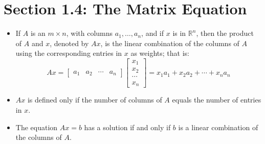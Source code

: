 \documentclass{article}
\newtheorem{theorem}{Theorem}
\begin{document}
\section*{Section 1.4: The Matrix Equation}

\begin{itemize}

  \item If $A$ is an $m \times n$, with columns $a_1, \ldots, a_n$, and if $x$ is in $\mathbb{R}^n$, then the product of $A$ and $x$, denoted by $Ax$, is the linear combination
  of the columns of $A$ using the corresponding entries in $x$ as weights; that is:
  \begin{equation*}
    Ax = 
    \begin{bmatrix}
      a_1 & a_2 & \cdots & a_n
    \end{bmatrix}
    \begin{bmatrix}
      x_1 \\ x_2 \\ \cdots \\ x_n
    \end{bmatrix}
    = x_1a_1 + x_2a_2 + \cdots + x_na_n
  \end{equation*}

  \item $Ax$ is defined only if the number of columns of $A$ equals the number of entries in $x$.

\end{itemize}

\noindent{}

\begin{itemize}

  \item The equation $Ax = b$ has a solution if and only if $b$ is a linear combination of the columns of $A$.

\end{itemize}
\end{document}
